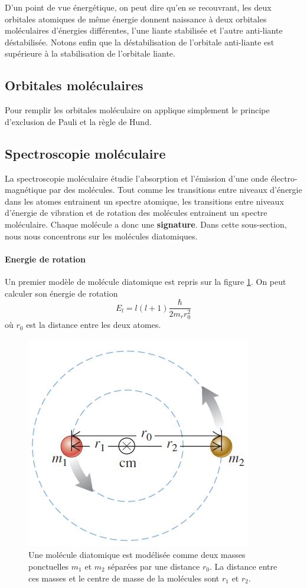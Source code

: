 D'un point de vue énergétique, on peut dire qu'en se
recouvrant, les deux orbitales atomiques de même énergie
donnent naissance à deux orbitales moléculaires d'énergies
différentes, l'une liante stabilisée et l'autre anti-liante
déstabilisée. Notons enfin que la déstabilisation de
l'orbitale anti-liante est supérieure à la stabilisation
de l'orbitale liante.

\subsection{Orbitales moléculaires}
Pour remplir les orbitales moléculaire on applique
simplement le principe d'exclusion de Pauli et
la règle de Hund.

\subsection{Spectroscopie moléculaire}
La spectroscopie moléculaire étudie l'absorption
et l'émission d'une onde électro-magnétique par 
des molécules. Tout comme les transitions entre niveaux
d'énergie dans les atomes entrainent un spectre atomique,
les transitions entre niveaux d'énergie de vibration
et de rotation des molécules entrainent un spectre moléculaire. 
Chaque molécule a donc une \textbf{signature}.
Dans cette sous-section, nous nous concentrons sur les
molécules diatomiques.

\paragraph{Energie de rotation}
Un premier modèle de molécule diatomique est repris
sur la figure \ref{fig:mol-dia1}. On peut calculer
son énergie de rotation
\[ E_l = l(l+1) \frac{\hbar}{2m_rr_0^2} \]
où $r_0$ est la distance entre les deux atomes.

\begin{figure}[ht]
	\centering
	\includegraphics[scale=0.7]{img/mol-dia1.jpg}
	\caption{Une molécule diatomique est modélisée
	comme deux masses ponctuelles $m_1$ et $m_2$
	séparées par une distance $r_0$. La distance entre
	ces masses et le centre de masse de la molécules
	sont $r_1$ et $r_2$.}
	\label{fig:mol-dia1}
\end{figure}

